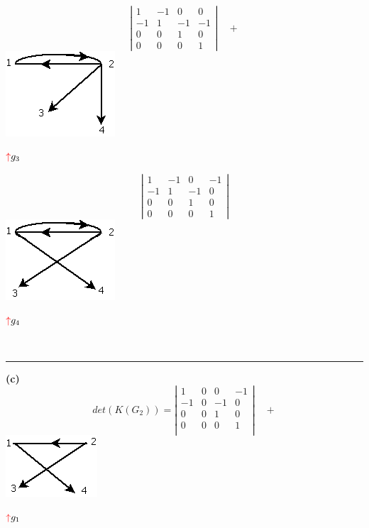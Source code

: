 \documentclass[10pt,a5paper]{book}
\begin{document}
\parbox{6cm}
{
    \[
    \left| \begin{array}{cccc}
        1 & -1 & 0 & 0 \\
        -1 & 1 & -1 & -1 \\
        0 & 0 & 1 & 0 \\
        0 & 0 & 0 & 1 
      \end{array}
    \right| \quad +\]
    \hspace*{.3in}\includegraphics[scale=.6]{Fig2_6_b3.png}
    \begin{center} $\textcolor{rojo}{\uparrow} g_3$ \end{center}
}
\hspace*{-.5in}\parbox{6cm}
{
    \[
    \left| \begin{array}{cccc}
        1 & -1 & 0 & -1 \\
        -1 & 1 & -1 & 0 \\
        0 & 0 & 1 & 0 \\
        0 & 0 & 0 & 1 
      \end{array}
    \right| \]
    \hspace*{.3in}\includegraphics[scale=.6]{Fig2_6_b4.png}
    \begin{center} $\textcolor{rojo}{\uparrow} g_4$ \end{center}
}\hfill\\
\hrule
\hspace*{-1in}\parbox{6cm}
{
  \textbf{(c)}\\
  \[
  det (K(G_2)) = \left | \begin{array}{cccc}
      1 & 0 & 0 & -1 \\
      -1 & 0 & -1 & 0 \\
      0 & 0 & 1 & 0 \\
      0 & 0 & 0 & 1 \\
      \end{array}
      \right | \quad + \]
      \hspace*{1in}\includegraphics[scale=.65]{Fig2_6_c1.png}
      \begin{center} $\textcolor{rojo}{\uparrow} g_1$ \end{center}
}
\end{document}
